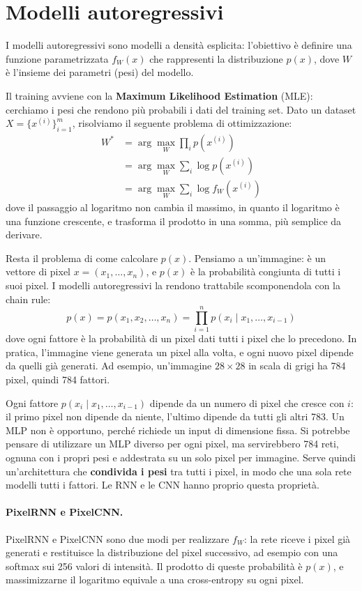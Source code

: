 \section{Modelli autoregressivi}\label{sec:autoregressivi}
I modelli autoregressivi sono modelli a densità esplicita: l'obiettivo è definire una funzione parametrizzata $f_W(x)$ che rappresenti la distribuzione $p(x)$, dove $W$ è l'insieme dei parametri (pesi) del modello.

Il training avviene con la \textbf{Maximum Likelihood Estimation} (MLE): cerchiamo i pesi che rendono più probabili i dati del training set. Dato un dataset $X = \{x^{(i)}\}_{i=1}^m$, risolviamo il seguente problema di ottimizzazione:
\[
    \begin{aligned}
        W^* &= \arg\max_W \prod_i p(x^{(i)}) \\
            &= \arg\max_W \sum_i \log p(x^{(i)}) \\
            &= \arg\max_W \sum_i \log f_W(x^{(i)})
    \end{aligned}
\]
dove il passaggio al logaritmo non cambia il massimo, in quanto il logaritmo è una funzione crescente, e trasforma il prodotto in una somma, più semplice da derivare.

Resta il problema di come calcolare $p(x)$. Pensiamo a un'immagine: è un vettore di pixel $x = (x_1, \dots, x_n)$, e $p(x)$ è la probabilità congiunta di tutti i suoi pixel. I modelli autoregressivi la rendono trattabile scomponendola con la chain rule:
\[
    p(x) = p(x_1, x_2, \dots, x_n) = \prod_{i=1}^{n} p(x_i \mid x_1, \dots, x_{i-1})
\]
dove ogni fattore è la probabilità di un pixel dati tutti i pixel che lo precedono. In pratica, l'immagine viene generata un pixel alla volta, e ogni nuovo pixel dipende da quelli già generati. Ad esempio, un'immagine $28 \times 28$ in scala di grigi ha 784 pixel, quindi 784 fattori.

Ogni fattore $p(x_i \mid x_1, \dots, x_{i-1})$ dipende da un numero di pixel che cresce con $i$: il primo pixel non dipende da niente, l'ultimo dipende da tutti gli altri 783. Un MLP non è opportuno, perché richiede un input di dimensione fissa. Si potrebbe pensare di utilizzare un MLP diverso per ogni pixel, ma servirebbero 784 reti, ognuna con i propri pesi e addestrata su un solo pixel per immagine. Serve quindi un'architettura che \textbf{condivida i pesi} tra tutti i pixel, in modo che una sola rete modelli tutti i fattori. Le RNN e le CNN hanno proprio questa proprietà.

\paragraph{PixelRNN e PixelCNN.} PixelRNN e PixelCNN sono due modi per realizzare $f_W$: la rete riceve i pixel già generati e restituisce la distribuzione del pixel successivo, ad esempio con una softmax sui 256 valori di intensità. Il prodotto di queste probabilità è $p(x)$, e massimizzarne il logaritmo equivale a una cross-entropy su ogni pixel.

